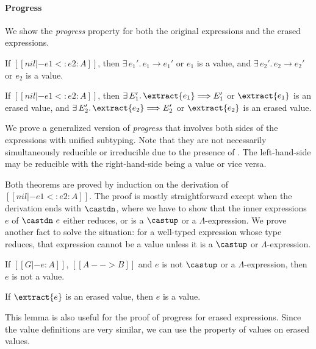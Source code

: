 \paragraph{Progress} We show the \emph{progress} property for both
the original expressions and the erased expressions.

\begin{theorem}
    If $[[nil |- e1 <: e2 : A]]$,
    then $\exists \, e_1'. \, e_1 \longrightarrow e_1'$ or $e_1$ is a value,
    and $\exists \, e_2'. \, e_2 \longrightarrow e_2'$ or $e_2$ is a value.
\end{theorem}

\begin{theorem}
    If $[[nil |- e1 <: e2 : A]]$,
    then $\exists \, E_1'. \, \extract{e_1} \Longrightarrow E_1'$ or $\extract{e_1}$ is an erased value,
    and $\exists \, E_2'. \, \extract{e_2} \Longrightarrow E_2'$ or $\extract{e_2}$ is an erased value.
\end{theorem}

\noindent We prove a generalized version of \emph{progress} that involves both sides
of the expressions with unified subtyping. Note that they are not necessarily
simultaneously reducible or irreducible due to the presence of .
The left-hand-side may be reducible with the right-hand-side being a value or vice versa.

Both theorems are proved by induction on the derivation of $[[nil |- e1 <: e2 : A]]$.
The proof is mostly straightforward except when the derivation ends with $\castdn$,
where we have to show that the inner expressions $e$ of $\castdn~e$ either reduces, or
is a $\castup$ or a $\Lambda$-expression. We prove another fact to solve the situation:
for a well-typed expression whose type reduces, that expression
cannot be a value unless it is a $\castup$ or $\Lambda$-expression.

\begin{lemma}
    If $[[G |- e : A]]$, $[[A --> B]]$ and $e$ is not $\castup$ or a $\Lambda$-expression,
    then $e$ is not a value.
\end{lemma}

\begin{lemma}
    If $\extract{e}$ is an erased value, then $e$ is a value.
\end{lemma}

This lemma is also useful for the proof of progress for erased expressions.
Since the value definitions are very similar, we can use the property of values
on erased values.

